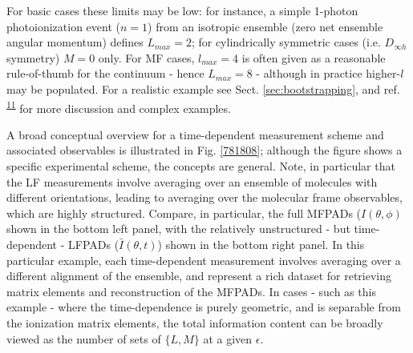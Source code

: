 \documentclass[10pt]{article}
\begin{document}
For basic cases these limits may be low: for instance, a simple 1-photon photoionization event ($n=1$) from an isotropic ensemble (zero net ensemble angular momentum) defines $L_{max}=2$; for cylindrically symmetric cases (i.e. $D_{\infty h}$ symmetry) $M=0$ only. For MF cases, $l_{max}=4$ is often given as a reasonable rule-of-thumb for the continuum - hence $L_{max}=8$ - although in practice higher-$l$ may be populated. For a realistic example see Sect. \ref{sec:bootstrapping}, and ref. \textsuperscript{\hyperref[csl:11]{11}} for more discussion and complex examples.

A broad conceptual overview for a time-dependent measurement scheme and associated observables is illustrated in Fig. \ref{781808}; although the figure shows a specific experimental scheme, the concepts are general. Note, in particular that the LF measurements involve averaging over an ensemble of molecules with different orientations, leading to averaging over the molecular frame observables, which are highly structured. Compare, in particular, the full MFPADs ($I(\theta,\phi)$ shown in the bottom left panel, with the relatively unstructured - but time-dependent - LFPADs ($\bar{I}(\theta,t)$) shown in the bottom right panel. In this particular example, each time-dependent measurement involves averaging over a different alignment of the ensemble, and represent a rich dataset for retrieving matrix elements and reconstruction of the MFPADs. In cases - such as this example - where the time-dependence is purely geometric, and is separable from the ionization matrix elements, the total information content can be broadly viewed as the number of sets of $\{L,M\}$ at a given $\epsilon$.


\end{document}
